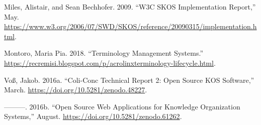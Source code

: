 \documentclass[
  DIV=10]{article}
\newlength{\cslhangindent}
\newenvironment{CSLReferences}[2] %
 {\begin{list}{}{%
  \setlength{\itemindent}{0pt}
  \setlength{\leftmargin}{0pt}
  \setlength{\parsep}{0pt}
  \ifodd #1
   \setlength{\leftmargin}{\cslhangindent}
   \setlength{\itemindent}{-1\cslhangindent}
  \fi
  \setlength{\itemsep}{#2\baselineskip}}}
 {\end{list}}
\begin{document}
\label{refs}
\begin{CSLReferences}{1}{0}
Miles, Alistair, and Sean Bechhofer. 2009. {``W3C SKOS Implementation
Report,''} May.
\url{https://www.w3.org/2006/07/SWD/SKOS/reference/20090315/implementation.html}.

Montoro, Maria Pia. 2018. {``Terminology Management Systems.''}
\url{https://recremisi.blogspot.com/p/acrolinxterminology-lifecycle.html}.

Voß, Jakob. 2016a. {``Coli-Conc {Technical} {Report} 2: {Open} {Source}
{KOS} Software,''} March. \url{https://doi.org/10.5281/zenodo.48227}.

---------. 2016b. {``Open {Source} Web Applications for {Knowledge}
{Organization} {Systems},''} August.
\url{https://doi.org/10.5281/zenodo.61262}.

\end{CSLReferences}
\end{document}
